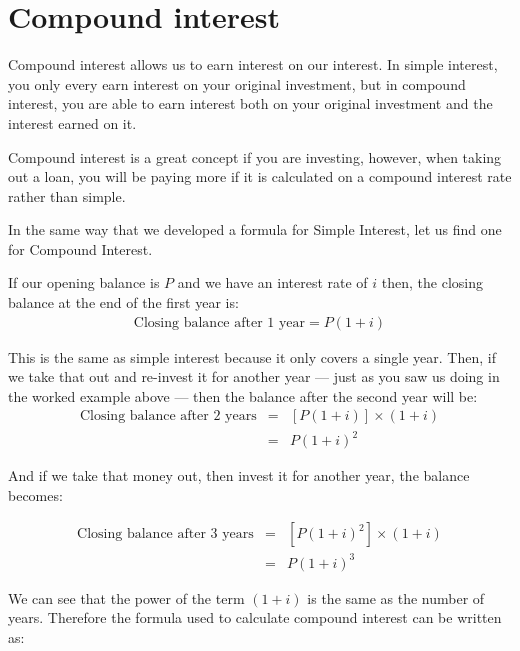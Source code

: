 \section{Compound interest}

Compound interest allows us to earn interest on our interest. In simple interest, you only every earn interest on your original investment, but in compound interest, you are able to earn interest both on your original investment and the interest earned on it.\par

Compound interest is a great concept if you are investing, however, when taking out a loan, you will be paying more if it is calculated on a compound interest rate rather than simple.




In the same way that we developed a formula for Simple Interest, let us find one for Compound Interest.\par

If our opening balance is $P$ and we have an interest rate of $i$ then, the closing balance at the end of the first year is:
\begin{eqnarray*}
    \text{Closing balance after 1 year} = P(1 + i)
\end{eqnarray*}

This is the same as simple interest because it only covers a single year. Then, if we take that out and re-invest it for another year --- just as you saw us doing in the worked example above --- then the balance after the second year will be:
\begin{eqnarray*}
    \text{Closing balance after 2 years} &=& [P(1 + i)] \times (1 + i)\\
    &=& P(1 + i)^2
\end{eqnarray*}

And if we take that money out, then invest it for another year, the balance becomes:

\begin{eqnarray*}
    \text{Closing balance after 3 years} &=& [P(1 + i)^2] \times (1 + i)\\
    &=& P(1 + i)^3
\end{eqnarray*}

We can see that the power of the term $(1 + i)$ is the same as the number of years. Therefore the formula used to calculate compound interest can be written as:


